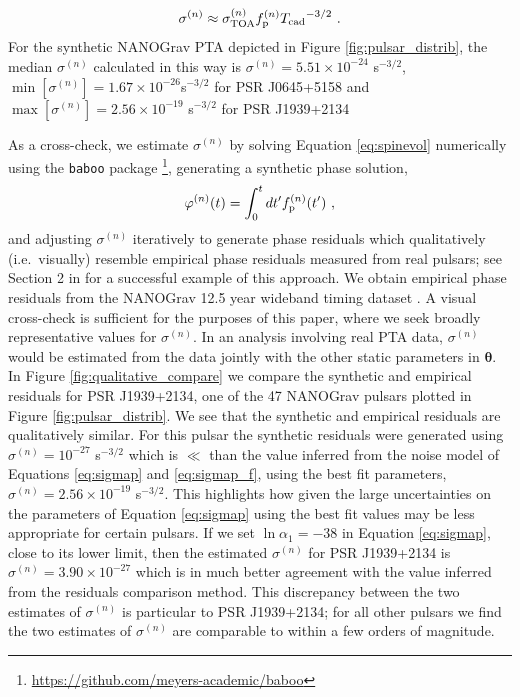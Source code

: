\documentclass[fleqn,usenatbib,useAMS]{mnras}
\begin{document}
\begin{eqnarray}
	\sigma^{(n)} \approx \sigma_{\rm TOA}^{(n)} f_{\rm p}^{(n)} {T_{\rm cad}}^{-3/2} \ . \label{eq:sigmap_f}
\end{eqnarray}
For the synthetic NANOGrav PTA depicted in Figure \ref{fig:pulsar_distrib}, the median $\sigma^{(n)}$ calculated in this way is $\sigma^{(n)} = 5.51 \times 10^{-24} $ s$^{-3/2}$, $\min [ \sigma^{(n)} ] = 1.67 \times 10^{-26}$s$^{-3/2}$ for PSR J0645+5158 and $\max [ \sigma^{(n)} ] = 2.56 \times 10^{-19}$ s$^{-3/2}$ for PSR J1939+2134 \newline 

As a cross-check, we estimate $\sigma^{(n)}$ by solving Equation \eqref{eq:spinevol} numerically using the \texttt{baboo} package \footnote{\url{https://github.com/meyers-academic/baboo}}, generating a synthetic phase solution,
\begin{eqnarray}
	\varphi^{(n)}(t) = \int_0^t dt' f^{(n)}_{\rm p}(t') \ ,
\end{eqnarray}
and adjusting $\sigma^{(n)}$ iteratively to generate phase residuals which qualitatively (i.e.\ visually) resemble empirical phase residuals measured from real pulsars; see Section 2 in \cite{Vargas} for a successful example of this approach. We obtain empirical phase residuals from the NANOGrav 12.5 year wideband timing dataset \citep{pennucci_timothy_t_2020_4312887,nanogravwideband}. A visual cross-check is sufficient for the purposes of this paper, where we seek broadly representative values for $\sigma^{(n)}$. In an analysis involving real PTA data, $\sigma^{(n)}$ would be estimated from the data jointly with the other static parameters in ${\boldsymbol{\theta}}$. In Figure \ref{fig:qualitative_compare} we compare the synthetic and empirical residuals for PSR J1939+2134, one of the 47 NANOGrav pulsars plotted in Figure \ref{fig:pulsar_distrib}. We see that the synthetic and empirical residuals are qualitatively similar. For this pulsar the synthetic residuals were generated using $\sigma^{(n)} = 10^{-27}$ s$^{-3/2}$ which is $\ll$ than the value inferred from the noise model of Equations \eqref{eq:sigmap} and \eqref{eq:sigmap_f}, using the best fit parameters, $\sigma^{(n)} = 2.56 \times 10^{-19}$ s$^{-3/2}$. This highlights how given the large uncertainties on the parameters of Equation \eqref{eq:sigmap} using the best fit values may be less appropriate for certain pulsars. If we set $\ln \alpha_1 = -38$ in Equation \eqref{eq:sigmap}, close to its lower limit, then the estimated $\sigma^{(n)}$ for  PSR J1939+2134 is $\sigma^{(n)} =3.90 \times 10^{-27}$ which is in much better agreement with the value inferred from the residuals comparison method. This discrepancy between the two estimates of $\sigma^{(n)}$ is particular to PSR J1939+2134; for all other pulsars we find the two estimates of $\sigma^{(n)}$ are comparable to within a few orders of magnitude.
\end{document}

